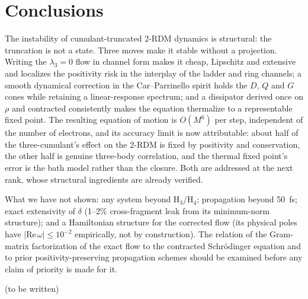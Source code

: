 \documentclass[aip,jcp,reprint,floatfix,superscriptaddress]{revtex4-2}
\begin{document}
\section{Conclusions}
The instability of cumulant-truncated 2-RDM dynamics is structural: the truncation is not a state. Three moves make it stable without a projection. Writing the $\lambda_3=0$ flow in channel form makes it cheap, Lipschitz and extensive and localizes the positivity risk in the interplay of the ladder and ring channels; a smooth dynamical correction in the Car--Parrinello spirit holds the $D$, $Q$ and $G$ cones while retaining a linear-response spectrum; and a dissipator derived once on $\rho$ and contracted consistently makes the equation thermalize to a representable fixed point. The resulting equation of motion is $O(M^6)$ per step, independent of the number of electrons, and its accuracy limit is now attributable: about half of the three-cumulant's effect on the 2-RDM is fixed by positivity and conservation, the other half is genuine three-body correlation, and the thermal fixed point's error is the bath model rather than the closure. Both are addressed at the next rank, whose structural ingredients are already verified.

What we have not shown: any system beyond H$_3$/H$_4$; propagation beyond 50~fs; exact extensivity of $\delta$ (1--2\% cross-fragment leak from its minimum-norm structure); and a Hamiltonian structure for the corrected flow (its physical poles have $|\mathrm{Re}\,\omega|\le10^{-2}$ empirically, not by construction). The relation of the Gram-matrix factorization of the exact flow to the contracted Schr\"odinger equation and to prior positivity-preserving propagation schemes \cite{mazziotti2006,lackner2015,joost2022} should be examined before any claim of priority is made for it.

\begin{acknowledgments}
(to be written)
\end{acknowledgments}
\end{document}
